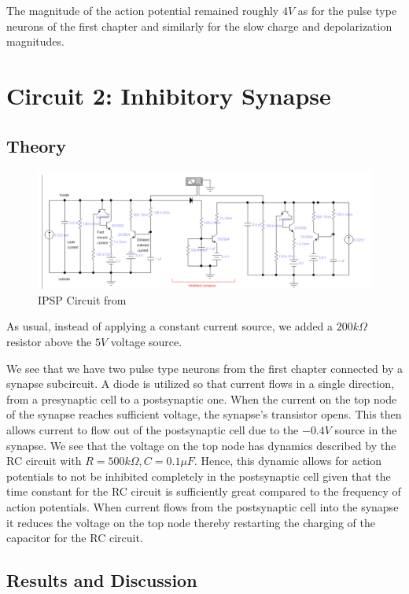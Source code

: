 \documentclass[12]{book}
\newcommand\0{\mathbf{0}}
\newcommand\<{\langle}
\renewcommand\>{\rangle}
\begin{document}
The magnitude of the action potential remained roughly $4V$ as for the pulse type neurons of the first chapter and similarly for the slow charge and depolarization magnitudes.

\section{Circuit 2: Inhibitory Synapse}

\subsection{Theory}

\begin{figure}[H]
\centering
\includegraphics[width=\textwidth]{inhibitory_circuit}	
\caption{IPSP Circuit from \cite{levitan2015neuron}}
\end{figure}

As usual, instead of applying a constant current source, we added a $200k\Omega$ resistor above the $5V$ voltage source.

We see that we have two pulse type neurons from the first chapter connected by a synapse subcircuit. A diode is utilized so that current flows in a single direction, from a presynaptic cell to a postsynaptic one. When the current on the top node of the synapse reaches sufficient voltage, the synapse's transistor opens. This then allows current to flow out of the postsynaptic cell due to the $-0.4V$ source in the synapse. We see that the voltage on the top node has dynamics described by the RC circuit with $R=500 k \Omega, C = 0.1 \mu F$. Hence, this dynamic allows for action potentials to not be inhibited completely in the postsynaptic cell given that the time constant for the RC circuit is sufficiently great compared to the frequency of action potentials. When current flows from the postsynaptic cell into the synapse it reduces the voltage on the top node thereby restarting the charging of the capacitor for the RC circuit.

\subsection{Results and Discussion}
\end{document}
